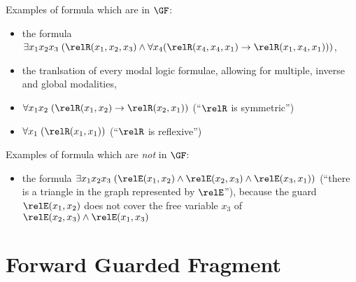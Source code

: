 \begin{example}
  Examples of formula which are in $\GF$:
  \begin{itemize}
    \item the formula $\exists{x_{1}x_{2}x_{3}}\; (\relR(x_{1}, x_{2}, x_{3}) \land \forall x_{4}(\relR(x_{4}, x_{4}, x_{1}) \to \relR(x_{1}, x_{4}, x_{1})))$,
    \item the tranlsation of every modal logic formulae, allowing for multiple, inverse and global modalities,
    \item $\forall{x_{1}x_{2}}\; (\relR(x_{1},x_{2}) \to \relR(x_{2},x_{1}))$ (``$\relR$ is symmetric'')
    \item $\forall{x_{1}}\; (\relR(x_{1},x_{1}))$ (``$\relR$ is reflexive'')
  \end{itemize}
  Examples of formula which are \emph{not} in $\GF$:
  \begin{itemize}
    \item the formula $\exists{x_{1}x_{2}x_{3}}\; (\relE(x_{1}, x_{2}) \land \relE(x_{2}, x_{3}) \land \relE(x_{3}, x_{1}))$ (``there is a triangle in the graph represented by $\relE$''), because the guard $\relE(x_{1}, x_{2})$ does not cover the free variable $x_{3}$ of $\relE(x_{2},x_{3}) \land \relE(x_{1}, x_{3})$
  \end{itemize}
\end{example}

\section{Forward Guarded Fragment}

